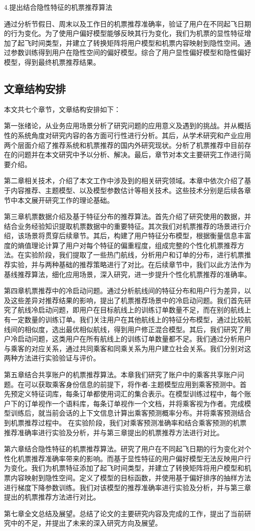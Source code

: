 4.提出结合隐性特征的机票推荐算法

通过分析节假日、周末以及工作日的机票推荐准确率，验证了用户在不同起飞日期的行为变化。为了使用户偏好模型能够反映其行为变化，我们为机票的显性特征增加了起飞时间类型，并建立了转换矩阵将用户模型和机票内容映射到隐性空间。通过参数训练得到用户在隐性空间的偏好模型。综合了用户显性偏好模型和隐性偏好模型，得到最终机票推荐结果。


\subsection{文章结构安排}
本文共七个章节，文章结构安排如下：

第一张绪论，从业务应用场景分析了研究问题的应用意义及遇到的挑战。并从概括性的系统角度对研究内容的各方面可行性进行分析。其后，从学术研究和产业应用两个层面介绍了推荐系统和机票推荐的国内外研究现状。分析了机票推荐中目前存在的问题并在本文研究中予以分析、解决。最后，章节对本文主要研究工作进行简要介绍。

第二章相关技术，介绍了本文工作中涉及到的相关研究领域。本章中依次介绍了基于内容推荐、主题模型、以及模型参数估计等相关技术。这些技术分别是后续各章节中本文展开研究工作的理论基础。

第三章机票数据介绍及基于特征分布的推荐算法。首先介绍了研究使用的数据，并结合业务经验知识提取机票数据中的重要特征。其次我们对机票推荐的场景进行介绍，该场景将贯穿后续章节。其后，构建了用户特征分布模型，根据衡量信息丰富度的熵值理论计算了用户对每个特征的偏重程度，组成完整的个性化机票推荐方法。在实验阶段，我们提取了一些热门航线，分析用户和订单的分布，进行机票推荐实验，并与两种基础的推荐策略进行了对比。在后续章节中，我们以此方法作为基线推荐算法，细化应用场景，深入研究，进一步提升个性化机票推荐的准确率。

第四章机票推荐中的冷启动问题。通过分析航线间的特征分布和用户行为差异，以及这些差异对推荐结果的影响，提出了机票推荐场景中的冷启动问题。我们首先研究了航线冷启动问题，即用户在目标航线上的训练订单数量不足，而在别的航线上有一定数量的训练订单。我们关注用户在其他航线上的特征分布模型，通过比较航线间的相似度，选出最优相似航线，得到用户修正混合模型。其后，我们研究了用户冷启动问题，这类用户在所有航线上的训练订单数量都不足。我们通过分析用户与乘客的对应关系，通过共同乘客和同乘关系为用户建立社会关系。我们分别对这两种方法进行实验验证与评价。

第五章结合共享账户的机票推荐算法。本章我们研究了账户中的乘客共享账户问题。在可以获取乘客身份信息的前提下，将作者-主题模型应用到乘客预测中。首先预定义特征词库，每条订单都使用词汇的集合表示。在模型训练过程中，每个账户下的订单视作一个语料库，每条订单视作一个文档，并将乘客视为作者。完成模型训练后，就当前会话的上下文信息计算出乘客预测概率分布。并将乘客预测结合到机票推荐过程中。
在实验阶段，我们对乘客预测准确率和结合乘客预测的机票推荐准确率进行实验及分析，并与第三章提出的机票推荐方法进行对比。

第六章结合隐性特征的机票推荐算法。研究了用户在不同起飞日期的行为变化对个性化机票推荐准确率带来的影响。而基于显性特征的用户偏好模型无法反映用户行为变化。我们为机票特征添加了起飞时间类型，并建立了转换矩阵将用户模型和机票内容映射到隐性空间。定义了模型的目标函数，并使用基于偏好排序的抽样方法进行梯度下降参数训练。我们对该模型的推荐准确率进行实验及分析，并与第三章提出的机票推荐方法进行对比。

第七章全文总结及展望。总结了论文的主要研究内容及完成的工作，提出了当前研究中的不足，并提出了未来的深入研究方向及展望。